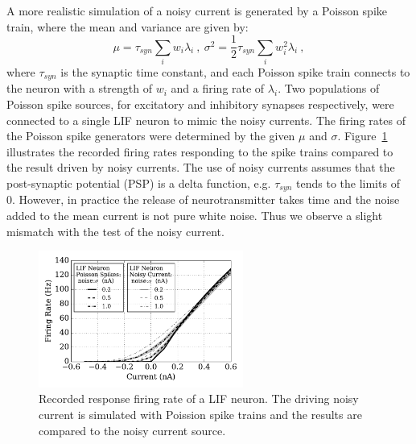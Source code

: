 	A more realistic simulation of a noisy current is generated by a Poisson spike train, 
	where the mean and variance are given by:
	\begin{equation}
	\mu = \tau_{syn}\sum_i w_i\lambda_{i}~,~\sigma^2=\frac{1}{2}\tau_{syn}\sum_i w_i^2\lambda_{i}~,
	\end{equation}
	where $\tau_{syn}$ is the synaptic time constant, and each Poisson spike train connects to the neuron with a strength of $w_i$ and a firing rate of $\lambda_i$.
	Two populations of Poisson spike sources, for excitatory and inhibitory synapses respectively, were connected to a single LIF neuron to mimic the noisy currents.
	The firing rates of the Poisson spike generators were determined by the given $\mu$ and $\sigma$.
	Figure~\ref{Fig:lif_pois} illustrates the recorded firing rates responding to the spike trains compared to the result driven by noisy currents.
	The use of noisy currents assumes that the post-synaptic potential (PSP) is a delta function, e.g. $\tau_{syn}$ tends to the limits of 0.
	However, in practice the release of neurotransmitter takes time and the noise added to the mean current is not pure white noise.
	Thus we observe a slight mismatch with the test of the noisy current. %
	\begin{figure}
		\centering
		\includegraphics[width=0.6\textwidth]{pics_iconip/3-1.pdf}
		\caption{Recorded response firing rate of a LIF neuron.
			The driving noisy current is simulated with Poission spike trains and the results are compared to the noisy current source.}
		\label{Fig:lif_pois}
	\end{figure}	
